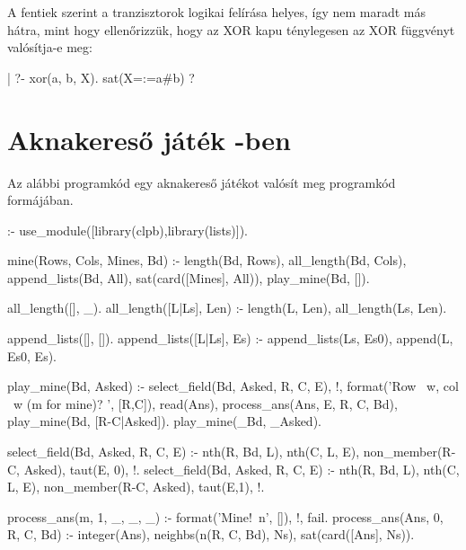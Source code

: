 A fentiek szerint a tranzisztorok logikai felírása helyes, így nem
maradt más hátra, mint hogy ellenőrizzük, hogy az XOR kapu ténylegesen
az XOR függvényt valósítja-e meg:

\begin{prologcode}
| ?- xor(a, b, X).               sat(X=:=a#b) ?
\end{prologcode}

\section{Aknakereső játék \Clpb -ben}

Az alábbi programkód egy aknakereső játékot valósít meg \clpb programkód
formájában.

\begin{prologcode}
:- use_module([library(clpb),library(lists)]).
\end{prologcode}
\begin{prologcode}
mine(Rows, Cols, Mines, Bd) :-
        length(Bd, Rows), all_length(Bd, Cols), 
        append_lists(Bd, All),
        sat(card([Mines], All)), play_mine(Bd, []).
\end{prologcode}
\begin{prologcode}
all_length([], _).
all_length([L|Ls], Len) :- 
        length(L, Len), all_length(Ls, Len).
\end{prologcode}
\begin{prologcode}
append_lists([], []).
append_lists([L|Ls], Es) :-
        append_lists(Ls, Es0), append(L, Es0, Es).
\end{prologcode}
\begin{prologcode}
play_mine(Bd, Asked) :- 
        select_field(Bd, Asked, R, C, E), !,
        format('Row ~w, col ~w (m for mine)? ', [R,C]), 
        read(Ans), process_ans(Ans, E, R, C, Bd), 
        play_mine(Bd, [R-C|Asked]).
play_mine(_Bd, _Asked).
\end{prologcode}
\begin{prologcode}
select_field(Bd, Asked, R, C, E) :-
        nth(R, Bd, L), nth(C, L, E), 
        non_member(R-C, Asked), taut(E, 0), !.
select_field(Bd, Asked, R, C, E) :-
        nth(R, Bd, L), nth(C, L, E), 
        non_member(R-C, Asked), \+ taut(E,1), !.
\end{prologcode}
\begin{prologcode}
process_ans(m, 1, _, _, _) :- 
        format('Mine!~n', []), !, fail.
process_ans(Ans, 0, R, C, Bd) :-
        integer(Ans), neighbs(n(R, C, Bd), Ns), 
        sat(card([Ans], Ns)).
\end{prologcode}
